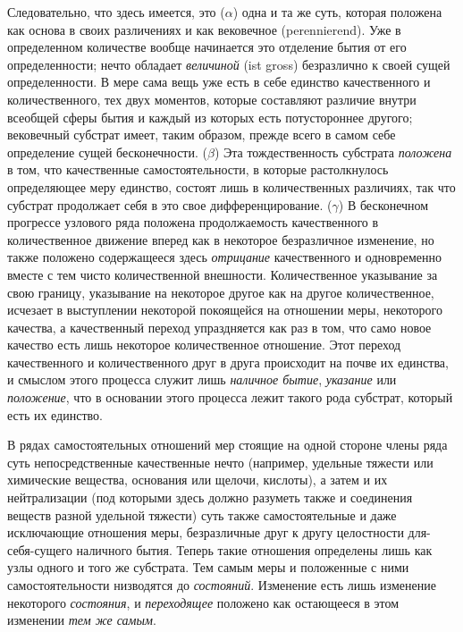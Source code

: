 Следовательно, что здесь имеется, это ({\em $\alpha $})
одна и та же суть, которая положена как основа в своих различениях и как
вековечное (perennierend). Уже в определенном количестве вообще начинается
это отделение бытия от его определенности; нечто обладает
{\em величиной} (ist gross) безразлично к своей сущей
определенности. В мере сама вещь уже есть в себе единство качественного и
количественного, тех двух моментов, которые составляют различие внутри
всеобщей сферы бытия и каждый из которых есть потустороннее другого;
вековечный субстрат имеет, таким образом, прежде всего в самом себе
определение сущей бесконечности. ({\em $\beta $}) Эта
тождественность субстрата {\em положена} в том, что
качественные самостоятельности, в которые растолкнулось определяющее меру
единство, состоят лишь в количественных различиях, так что субстрат
продолжает себя в это свое дифференцирование.
({\em $\gamma $}) В бесконечном прогрессе узлового ряда
положена продолжаемость качественного в количественное движение вперед как
в некоторое безразличное изменение, но также положено содержащееся здесь
{\em отрицание} качественного и одновременно вместе с
тем чисто количественной внешности. Количественное указывание за свою
границу, указывание на некоторое другое как на другое количественное,
исчезает в выступлении некоторой покоящейся на отношении меры, некоторого
качества, а качественный переход упраздняется как раз в том, что само новое
качество есть лишь некоторое количественное отношение. Этот переход
качественного и количественного друг в друга происходит на почве их
единства, и смыслом этого процесса служит лишь
{\em наличное бытие},
{\em указание} или {\em положение},
что в основании этого процесса лежит такого рода субстрат, который есть их
единство.

В рядах самостоятельных отношений мер стоящие на одной стороне члены ряда
суть непосредственные качественные нечто (например, удельные тяжести или
химические вещества, основания или щелочи, кислоты), а затем и их
нейтрализации (под которыми здесь должно разуметь также и соединения
веществ разной удельной тяжести) суть также самостоятельные и даже
исключающие отношения меры, безразличные друг к другу целостности
для-себя-сущего наличного бытия. Теперь такие отношения определены лишь как
узлы одного и того же субстрата. Тем самым меры и положенные с ними
самостоятельности низводятся до {\em состояний}.
Изменение есть лишь изменение некоторого
{\em состояния}, и
{\em переходящее} положено как остающееся в этом
изменении {\em тем же самым}.

